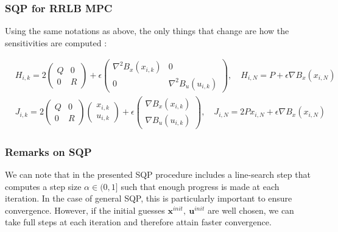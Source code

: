 \documentclass[12pt]{article}
\begin{document}
\subsubsection{SQP for RRLB MPC}

Using the same notations as above, the only things that change are how the sensitivities are computed :

\begin{align*}
	&H_{i,k}=2\begin{pmatrix}Q&0\\0&R\end{pmatrix}+\epsilon\begin{pmatrix}\nabla^2B_x(x_{i,k})&0\\0&\nabla^2B_u(u_{i,k})\end{pmatrix},\quad H_{i,N}=P+\epsilon\nabla B_x(x_{i,N})\\
	&J_{i,k}=2\begin{pmatrix}Q&0\\0&R\end{pmatrix}\begin{pmatrix} x_{i,k}\\ u_{i,k}\end{pmatrix}+\epsilon\begin{pmatrix}\nabla B_x(x_{i,k})\\\nabla B_u(u_{i,k})\end{pmatrix},\quad J_{i,N}=2P x_{i,N}+\epsilon\nabla B_x(x_{i,N})
\end{align*}

\subsubsection{Remarks on SQP}

We can note that in \cite{mpc-rti} the presented SQP procedure includes a line-search step that computes a step size $\alpha\in(0,1]$ such that enough progress is made at each iteration.
In the case of general SQP, this is particularly important to ensure convergence.
However, if the initial guesses $\mathbf{x}^{init},~\mathbf{u}^{init}$ are well chosen, we can take full steps at each iteration and therefore attain faster convergence.
\end{document}
